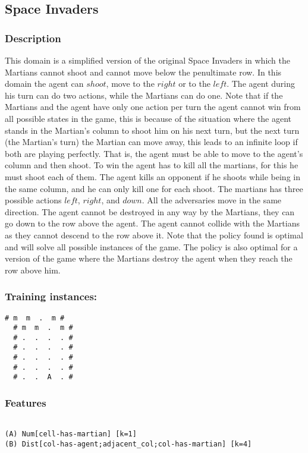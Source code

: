 \documentclass[a4paper]{article}
\begin{document}
\subsection{Space Invaders}

\subsubsection{Description}
This domain is a simplified version of the original Space Invaders in which the Martians cannot shoot and cannot move below the penultimate row. In this domain the agent can $shoot$, move to the $right$ or to the $left$. The agent during his turn can do two actions, while the Martians can do one. Note that if the Martians and the agent have only one action per turn the agent cannot win from all possible states in the game, this is because of the situation where the agent stands in the Martian's column to shoot him on his next turn, but the next turn (the Martian's turn) the Martian can move away, this leads to an infinite loop if both are playing perfectly. That is, the agent must be able to move to the agent's column and then shoot. To win the agent has to kill all the martians, for this he must shoot each of them. The agent kills an opponent if he shoots while being in the same column, and he can only kill one for each shoot. The martians has three possible actions $left$, $right$, and $down$. All the adversaries move in the same direction. The agent cannot be destroyed in any way by the Martians, they can go down to the row above the agent. The agent cannot collide with the Martians as they cannot descend to the row above it. Note that the policy found is optimal and will solve all possible instances of the game. The policy is also optimal for a version of the game where the Martians destroy the agent when they reach the row above him.

\subsubsection{Training instances:}
\begin{Verbatim}[fontsize=\footnotesize]
  # m  m  .  m #
  # m  m  .  m #
  # .  .  .  . #
  # .  .  .  . #
  # .  .  .  . #
  # .  .  .  . #
  # .  .  A  . #
\end{Verbatim}

\subsubsection{Features}
\begin{Verbatim}[fontsize=\footnotesize]

(A) Num[cell-has-martian] [k=1]
(B) Dist[col-has-agent;adjacent_col;col-has-martian] [k=4]
\end{Verbatim}
\end{document}
